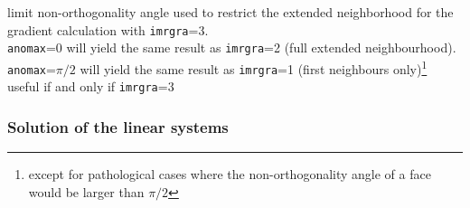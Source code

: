 {limit non-orthogonality angle used to restrict the extended neighborhood for
the gradient calculation with {\tt imrgra}=3.\\
{\tt anomax}=0 will yield the same result as {\tt imrgra}=2 (full extended
neighbourhood). {\tt anomax}=$\pi/2$ will yield the same result as
{\tt imrgra}=1
(first neighbours only)\footnote{except for pathological cases where the
non-orthogonality angle of a face would be larger than $\pi/2$}\\
useful if and only if {\tt imrgra}=3}

\subsubsection{Solution of the linear systems}

